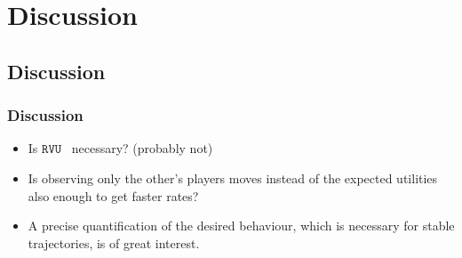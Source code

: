 \documentclass{beamer}
\newcommand{\myprop}{\ensuremath{\texttt{RVU}}}
\begin{document}
\section{Discussion}
\subsection{Discussion}
\begin{frame}
	\frametitle{Discussion}
	\begin{itemize}
		\item Is \myprop~ necessary? (probably not)
		\item Is observing only the other's players moves instead of the expected utilities also enough to get faster rates?
		\item A precise quantification of the desired behaviour, which is necessary for stable trajectories, is of great interest.
	\end{itemize}
\end{frame}
\end{document}
